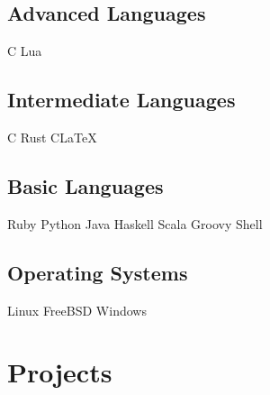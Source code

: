 \documentclass[8pt]{article}
\newcommand\csharp{C\scalerel*{\#}{X}}
\def\cpp{{C\nolinebreak[4]\hspace{-.05em}\raisebox{.4ex}{\tiny\bf ++\xspace}}}
\newcommand\bt{\large\xspace{\bf\textperiodcentered}\xspace}
\begin{document}
\begin{minipage}[t]{0.35\textwidth}

\centering

\subsection*{Advanced Languages}
\cpp \bt Lua

\subsection*{Intermediate Languages}
C \bt Rust \bt \csharp \bt \LaTeX

\subsection*{Basic Languages}
Ruby \bt Python \bt Java \bt Haskell
Scala \bt Groovy \bt Shell

\subsection*{Operating Systems}
Linux \bt FreeBSD \bt Windows

\end{minipage}

\centering
\section*{Projects}
\end{document}

